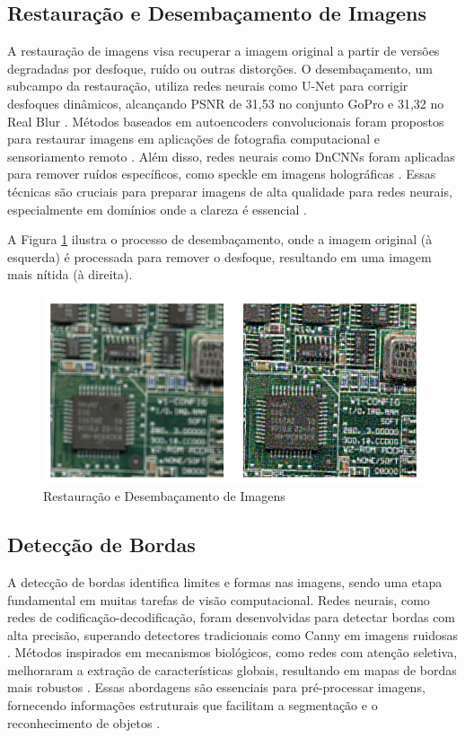 \subsection{Restauração e Desembaçamento de Imagens}
A restauração de imagens visa recuperar a imagem original a partir de versões degradadas por desfoque, ruído ou outras distorções. O desembaçamento, um subcampo da restauração, utiliza redes neurais como U-Net para corrigir desfoques dinâmicos, alcançando PSNR de 31,53 no conjunto GoPro e 31,32 no Real Blur \cite{Lian2023Deblurring}. Métodos baseados em autoencoders convolucionais foram propostos para restaurar imagens em aplicações de fotografia computacional e sensoriamento remoto \cite{barreto2020cnn}. Além disso, redes neurais como DnCNNs foram aplicadas para remover ruídos específicos, como speckle em imagens holográficas \cite{sharma2024deep}. Essas técnicas são cruciais para preparar imagens de alta qualidade para redes neurais, especialmente em domínios onde a clareza é essencial \cite{sumida2019deep}.

A Figura \ref{fig:desembacamento} ilustra o processo de desembaçamento, onde a imagem original (à esquerda) é processada para remover o desfoque, resultando em uma imagem mais nítida (à direita).

\begin{figure}[H]
    \centering
    \caption{\label{fig:desembacamento}Restauração e Desembaçamento de Imagens}
    \includegraphics[width=1\textwidth]{img/revisao_bibliografica/desembacamento.png}
\end{figure}

\subsection{Detecção de Bordas}
A detecção de bordas identifica limites e formas nas imagens, sendo uma etapa fundamental em muitas tarefas de visão computacional. Redes neurais, como redes de codificação-decodificação, foram desenvolvidas para detectar bordas com alta precisão, superando detectores tradicionais como Canny em imagens ruidosas \cite{yu1994edge}. Métodos inspirados em mecanismos biológicos, como redes com atenção seletiva, melhoraram a extração de características globais, resultando em mapas de bordas mais robustos \cite{chen2022edge}. Essas abordagens são essenciais para pré-processar imagens, fornecendo informações estruturais que facilitam a segmentação e o reconhecimento de objetos \cite{yu1994edge}.

